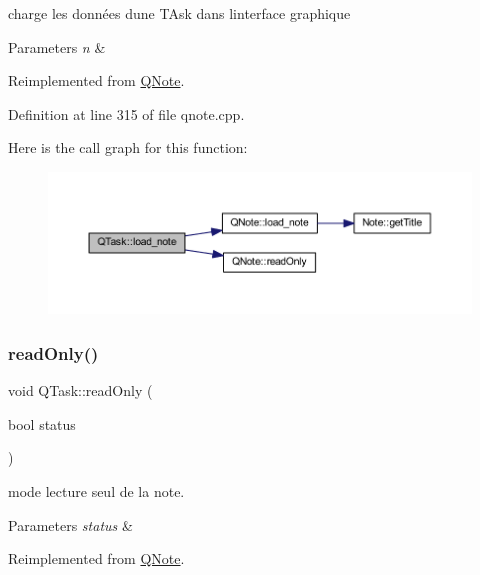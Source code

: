 charge les données d\textquotesingle{}une T\+Ask dans l\textquotesingle{}interface graphique 


\begin{DoxyParams}{Parameters}
{\em n} & \\
\hline
\end{DoxyParams}


Reimplemented from \hyperlink{class_q_note_adca0a8f2851fbb1c3843ca4fe7957c11}{Q\+Note}.



Definition at line 315 of file qnote.\+cpp.

Here is the call graph for this function\+:\nopagebreak
\begin{figure}[H]
\begin{center}
\leavevmode
\includegraphics[width=350pt]{class_q_task_a548fc51beaa1dcea345c362782aa11c0_cgraph}
\end{center}
\end{figure}
\mbox{\label{class_q_task_a1bf9080c14e7a94094bde3fa315d66d9}} 
\subsubsection{\texorpdfstring{read\+Only()}{readOnly()}}
{\footnotesize\ttfamily void Q\+Task\+::read\+Only (\begin{DoxyParamCaption}\item[{bool}]{status }\end{DoxyParamCaption})\hspace{0.3cm}{\ttfamily [virtual]}}



mode lecture seul de la note. 


\begin{DoxyParams}{Parameters}
{\em status} & \\
\hline
\end{DoxyParams}


Reimplemented from \hyperlink{class_q_note_ae6fb14b839acc1979b145a892d6a0a92}{Q\+Note}.



